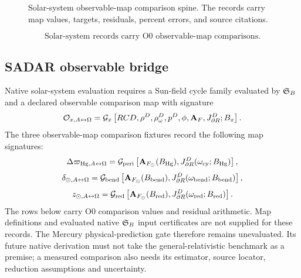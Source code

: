 \begin{figure}[h]
\centering
\scriptsize
{}
\caption{Solar-system observable-map comparison spine. The records carry map values, targets, residuals, percent errors, and source citations.}
\label{fig:manual-solar-system-spine}

\end{figure}

\[
\boxed{\text{Solar-system records carry O0 observable-map comparisons.}}
\]

\subsection{SADAR observable bridge}\label{manual:solar:observable-export-bridge}
Native solar-system evaluation requires a Sun-field cycle family evaluated by \(\mathfrak S_B\) and a declared observable comparison map with signature
\[
\mathcal O_{x,A{\leftrightarrow}\Omega}
=
\mathcal G_x
\left[
RCD,\rho^D,\rho^D_\omega,p^D,\phi,\mathbf A_F,J^D_{\partial R};B_x
\right].
\]
The three observable-map comparison fixtures record the following map signatures:
\[
\Delta\varpi_{\mathrm{Hg},A{\leftrightarrow}\Omega}
=
\mathcal G_{\mathrm{peri}}
\left[
\mathbf A_{F_\odot}(B_{\mathrm{Hg}}),
J^D_{\partial R}(\omega_{\mathrm{cy}};B_{\mathrm{Hg}})
\right],
\]
\[
\delta_{\odot,A{\leftrightarrow}\Omega}
=
\mathcal G_{\mathrm{bend}}
\left[
\mathbf A_{F_\odot}(B_{\mathrm{bend}}),
J^D_{\partial R}(\omega_{\mathrm{bend}};B_{\mathrm{bend}})
\right],
\]
\[
z_{\odot,A{\leftrightarrow}\Omega}
=
\mathcal G_{\mathrm{red}}
\left[
\mathbf A_{F_\odot}(B_{\mathrm{red}}),
J^D_{\partial R}(\omega_{\mathrm{red}};B_{\mathrm{red}})
\right].
\]
The rows below carry O0 comparison values and residual arithmetic. Map definitions and evaluated native \(\mathfrak S_B\) input certificates are not supplied for these records.
The Mercury physical-prediction gate therefore remains unevaluated. Its
future native derivation must not take the general-relativistic benchmark
as a premise; a measured comparison also needs its estimator, source locator,
reduction assumptions and uncertainty.



